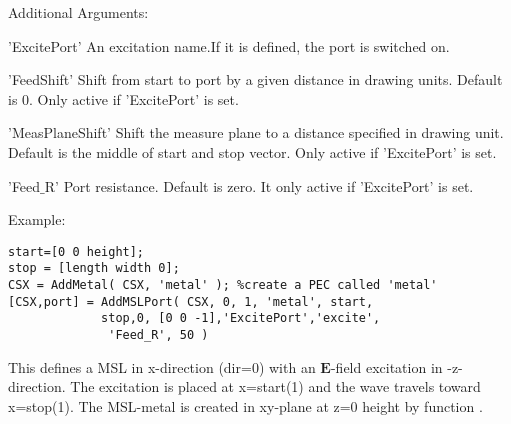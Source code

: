 \begin{FontDescr}{Additional Arguments:}
\begin{FontPara}{'ExcitePort'}
An excitation name.If it is defined, the port is switched on.
\end{FontPara}
\begin{FontPara}{'FeedShift'}
Shift from start to port by a given distance in drawing units. Default is 0. Only active if 'ExcitePort' is set.
\end{FontPara}
\begin{FontPara}{'MeasPlaneShift'}
Shift the measure plane to a distance specified in drawing unit. Default is the middle of start and stop vector. Only active if 'ExcitePort' is set.
\end{FontPara}

\textcolor{varcol}{'Feed$\_$R'}
Port resistance. Default is zero. It only active if 'ExcitePort' is set.

\end{FontDescr}

\begin{FontDescr}{Example:}
\begin{lstlisting} 
start=[0 0 height]; 
stop = [length width 0]; 
CSX = AddMetal( CSX, 'metal' ); %create a PEC called 'metal'
[CSX,port] = AddMSLPort( CSX, 0, 1, 'metal', start,
             stop,0, [0 0 -1],'ExcitePort','excite',     
              'Feed_R', 50 )
\end{lstlisting} 

This defines a MSL in x-direction (dir=0) with an $\mathbf{E}$-field excitation in -z-direction. The excitation is placed at x=start(1) and 
the wave travels toward x=stop(1). The MSL-metal is created in xy-plane at z=0 height by function \hyperref[addmetal]{}.
    
\end{FontDescr}